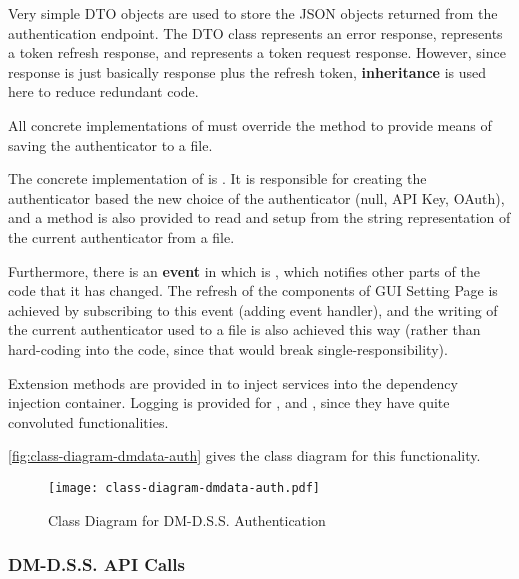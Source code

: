 Very simple DTO objects are used to store the JSON objects returned from the authentication endpoint. The  DTO class represents an error response,  represents a token refresh response, and  represents a token request response. However, since  response is just basically  response plus the refresh token, \textbf{inheritance} is used here to reduce redundant code.

All concrete implementations of  must override the  method to provide means of saving the authenticator to a file.

The concrete implementation of  is . It is responsible for creating the authenticator based the new choice of the authenticator (null, API Key, OAuth), and a method is also provided to read and setup from the string representation of the current authenticator from a file.

Furthermore, there is an \textbf{event} in  which is , which notifies other parts of the code that it has changed. The refresh of the components of GUI Setting Page is achieved by subscribing to this event (adding event handler), and the writing of the current authenticator used to a file is also achieved this way (rather than hard-coding into the code, since that would break single-responsibility).

Extension methods are provided in  to inject services into the dependency injection container. Logging is provided for ,  and , since they have quite convoluted functionalities.

\autoref{fig:class-diagram-dmdata-auth} gives the class diagram for this functionality.

\begin{figure}[htp]
    \centering
    \texttt{[image: class-diagram-dmdata-auth.pdf]}
    \caption{Class Diagram for DM-D.S.S. Authentication}
    \label{fig:class-diagram-dmdata-auth}
\end{figure}

\subsubsection{DM-D.S.S. API Calls}

